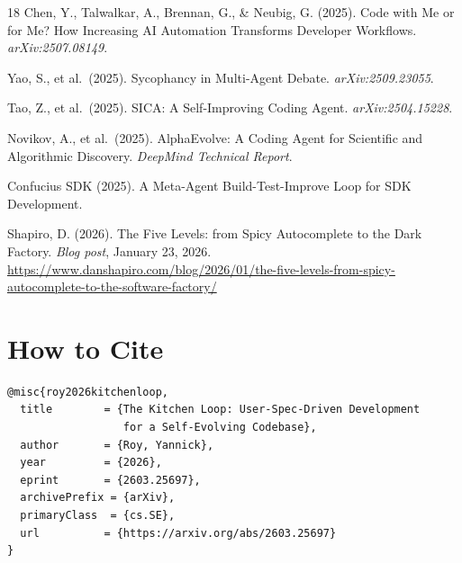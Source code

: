 \documentclass[11pt,a4paper]{article}
\begin{document}
\begin{thebibliography}{18}
 Chen, Y., Talwalkar, A., Brennan, G., \& Neubig, G. (2025). Code with Me or for Me? How Increasing AI Automation Transforms Developer Workflows. \emph{arXiv:2507.08149}.

 Yao, S., et al.~(2025). Sycophancy in Multi-Agent Debate. \emph{arXiv:2509.23055}.

 Tao, Z., et al.~(2025). SICA: A Self-Improving Coding Agent. \emph{arXiv:2504.15228}.

 Novikov, A., et al.~(2025). AlphaEvolve: A Coding Agent for Scientific and Algorithmic Discovery. \emph{DeepMind Technical Report}.

 Confucius SDK (2025). A Meta-Agent Build-Test-Improve Loop for SDK Development.

 Shapiro, D. (2026). The Five Levels: from Spicy Autocomplete to the Dark Factory. \emph{Blog post}, January 23, 2026. \url{https://www.danshapiro.com/blog/2026/01/the-five-levels-from-spicy-autocomplete-to-the-software-factory/}

\end{thebibliography}

\section{How to Cite}\label{sec:how-to-cite}

\begin{verbatim}
@misc{roy2026kitchenloop,
  title        = {The Kitchen Loop: User-Spec-Driven Development
                  for a Self-Evolving Codebase},
  author       = {Roy, Yannick},
  year         = {2026},
  eprint       = {2603.25697},
  archivePrefix = {arXiv},
  primaryClass  = {cs.SE},
  url          = {https://arxiv.org/abs/2603.25697}
}
\end{verbatim}
\end{document}
